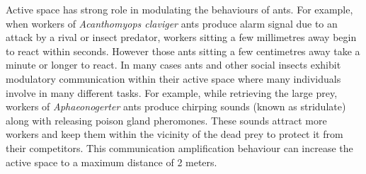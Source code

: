 Active space has strong role in modulating the behaviours of ants. For example, when workers of {\em Acanthomyops claviger} ants produce alarm signal due to an attack by a rival or insect predator, workers sitting a few millimetres away begin to react within seconds. However those ants sitting a few centimetres away take a minute or longer to react. In many cases ants and other social insects exhibit modulatory communication within their active space where many individuals involve in many different tasks. For example, while retrieving the large prey, workers of {\em Aphaeonogerter} ants produce chirping sounds (known as stridulate) along with releasing poison gland pheromones. These sounds attract more workers and keep them within the vicinity of the dead prey  to protect it from their competitors. This communication amplification behaviour can increase the active space to a maximum distance of 2 meters.
